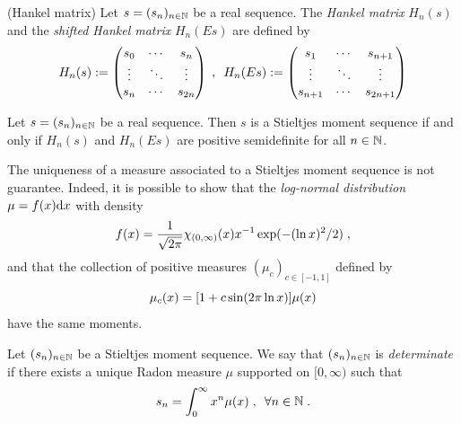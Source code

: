 \documentclass[11pt]{amsart}
\begin{document}
\begin{definition}(Hankel matrix) Let $s = (s_n)_{n \in \mathbb{N}}$ be a real sequence. The \emph{Hankel matrix} $H_n(s)$ and the \emph{shifted Hankel matrix} $H_n(Es)$ are defined by
    \begin{equation*}
        H_n(s) := \begin{pmatrix}
        s_0 & \cdots & s_n \\
        \vdots & \ddots & \vdots \\
        s_n & \cdots & s_{2n} \\
        \end{pmatrix}
        \; , \enspace
        H_n(Es) := \begin{pmatrix}
        s_1 & \cdots & s_{n+1} \\
        \vdots & \ddots & \vdots \\
        s_{n+1} & \cdots & s_{2n+1} \\
        \end{pmatrix}
    \end{equation*}
\end{definition}

\begin{theorem} Let $s = (s_n)_{n \in \mathbb{N}}$ be a real sequence. Then $s$ is a Stieltjes moment sequence if and only if 
    $H_n(s)$ and $H_n(Es)$ are positive semidefinite for all $n \in \mathbb{N}$.
\end{theorem}

\begin{remark}
The uniqueness of a measure associated to a Stieltjes moment sequence is not guarantee. Indeed, it is possible to show that the \emph{log-normal distribution} $\mathrm \mu = f(x)\mathrm dx$ with density 
    \begin{equation*}
        f(x) = \frac{1}{\sqrt{2\pi}}\chi_{(0, \infty)}(x) x^{-1} \exp(- (\ln x)^2 / 2)
        \; ,
    \end{equation*}
and that the collection of positive measures $(\mu_c)_{c \in [-1, 1]}$ defined by 
    \begin{equation*}
        \mathrm \mu_c(x) = [1 + c \sin(2\pi \ln x)] \mathrm \mu(x)
    \end{equation*}
have the same moments.
\end{remark}

\begin{definition}
Let  $(s_n)_{n \in \mathbb{N}}$ be a Stieltjes moment sequence. We say that $(s_n)_{n \in \mathbb{N}}$ is \emph{determinate} if there exists a unique Radon measure $\mu$ supported on $[0, \infty)$ such that
    \begin{equation*}
        s_n = \int_0^\infty x^n \mathrm \mu(x)
        \; , \enspace
        \forall n \in \mathbb{N}
        \; .
    \end{equation*}
\end{definition}
\end{document}
